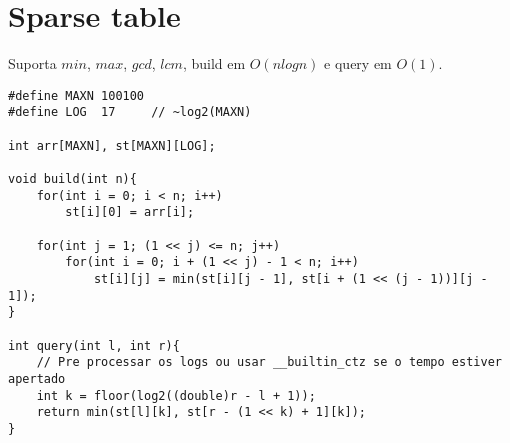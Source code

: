 \section{Sparse table}

Suporta $min$, $max$, $gcd$, $lcm$, build em $O(nlogn)$ e query em $O(1)$.
\begin{multicols}{2}
	\begin{lstlisting}
#define MAXN 100100
#define LOG  17     // ~log2(MAXN)

int arr[MAXN], st[MAXN][LOG];

void build(int n){
	for(int i = 0; i < n; i++)
		st[i][0] = arr[i];
	
	for(int j = 1; (1 << j) <= n; j++)
		for(int i = 0; i + (1 << j) - 1 < n; i++)
			st[i][j] = min(st[i][j - 1], st[i + (1 << (j - 1))][j - 1]);
}

int query(int l, int r){
	// Pre processar os logs ou usar __builtin_ctz se o tempo estiver apertado
	int k = floor(log2((double)r - l + 1));
	return min(st[l][k], st[r - (1 << k) + 1][k]);
}
\end{lstlisting}
\end{multicols}
